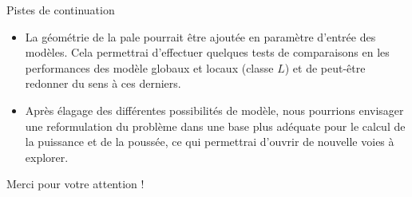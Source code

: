\documentclass[
11pt,notheorems,hyperref={pdfauthor=whatever}
]{beamer}
\begin{document}
\begin{frame}{Pistes de continuation}
    \begin{itemize}
        \item La géométrie de la pale pourrait être ajoutée en paramètre d'entrée des modèles. Cela permettrai d'effectuer quelques
            tests de comparaisons en les performances des modèle globaux et locaux (classe $L$) et de peut-être redonner du sens à ces derniers.
        \item     Après élagage des différentes possibilités de modèle, nous pourrions envisager une reformulation du problème dans
    une base plus adéquate pour le calcul de la puissance et de la poussée, ce qui permettrai d'ouvrir de nouvelle voies à explorer.
        \end{itemize}
\end{frame}

\begin{frame}{Merci pour votre attention !}
    
\end{frame}
\end{document}
